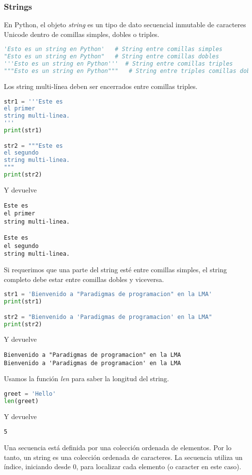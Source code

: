     \subsubsection{Strings}\label{subsubsec: strings}
    En Python, el objeto \emph{string} es un tipo de dato secuencial inmutable de caracteres Unicode dentro de comillas simples, dobles o triples.
    \begin{lstlisting}[language = {python}]
'Esto es un string en Python'   # String entre comillas simples
"Esto es un string en Python"   # String entre comillas dobles
'''Esto es un string en Python'''  # String entre comillas triples
"""Esto es un string en Python"""   # String entre triples comillas dobles
    \end{lstlisting}
    Los string multi-línea deben ser encerrados entre comillas triples.
    \begin{lstlisting}[language = {python}]
str1 = '''Este es
el primer
string multi-linea.
'''
print(str1)

str2 = """Este es
el segundo
string multi-linea.
"""
print(str2)
    \end{lstlisting}
    Y devuelve
    \begin{lstlisting}[language = {[latex]tex}]
Este es
el primer
string multi-linea.

Este es
el segundo
string multi-linea.
    \end{lstlisting}
    Si requerimos que una parte del string esté entre comillas simples, el string completo debe estar entre comillas dobles y viceversa.
    \begin{lstlisting}[language = {python}]
str1 = 'Bienvenido a "Paradigmas de programacion" en la LMA'
print(str1)

str2 = "Bienvenido a 'Paradigmas de programacion' en la LMA"
print(str2)
    \end{lstlisting}
    Y devuelve
    \begin{lstlisting}[language = {[latex]tex}]
Bienvenido a "Paradigmas de programacion" en la LMA
Bienvenido a 'Paradigmas de programacion' en la LMA
    \end{lstlisting}
    Usamos la función \emph{len} para saber la longitud del string.
    \begin{lstlisting}[language = {python}]
greet = 'Hello'
len(greet)
    \end{lstlisting}
    Y devuelve
    \begin{lstlisting}[language = {[latex]tex}]
5
    \end{lstlisting}
    Una secuencia está definida por una colección ordenada de elementos. Por lo tanto, un string es una colección ordenada de caracteres. La secuencia utiliza un índice, iniciando desde 0, para localizar cada elemento (o caracter en este caso).
